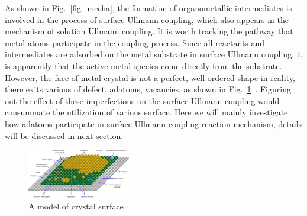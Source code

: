 \documentclass[%
 reprint,
 amsmath,amssymb,
 aps,
prb,
]{revtex4-2}
\begin{document}
As shown in Fig.~\ref{fig_mecha}, the formation of organometallic intermediates is involved in the process of surface Ullmann coupling, which also appears in the mechanism of solution Ullmann coupling. It is worth tracking the pathway that metal atoms participate in the coupling process. Since all reactants and intermediates are adsorbed on the metal substrate in surface Ullmann coupling, it is apparently that the active metal species come directly from the substrate. However, the face of metal crystal is not a perfect, well-ordered shape in reality, there exits various of defect, adatoms, vacancies, as shown in Fig.~\ref{cyrstal_surface}~\cite{ullmann_49}. Figuring out the effect of these imperfections on the surface Ullmann coupling would consummate the utilization of various surface. Here we will mainly investigate how adatoms participate in surface Ullmann coupling reaction mechanism, details will be discussed in next section.

\begin{figure}[htb]
\centering
\includegraphics[width=0.4\textwidth]{Fig/Crystal_surface.jpg}
\caption{A model of crystal surface}
\label{cyrstal_surface}
\end{figure}
\end{document}
